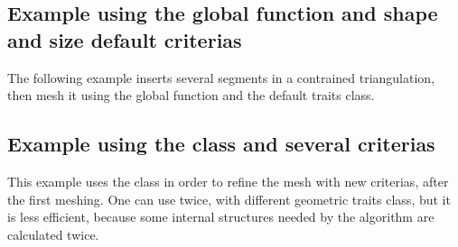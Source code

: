 \subsection{Example using the global function and shape and size default
  criterias}

The following example inserts several segments in a contrained
triangulation, then mesh it using the global function
 and the default traits class.


\subsection{Example using the class  and several
  criterias}

This example uses the class  in order to refine
the mesh with new criterias, after the first meshing. One can use
 twice, with different geometric traits class,
but it is less efficient, because some internal structures needed by the
algorithm are calculated twice.



